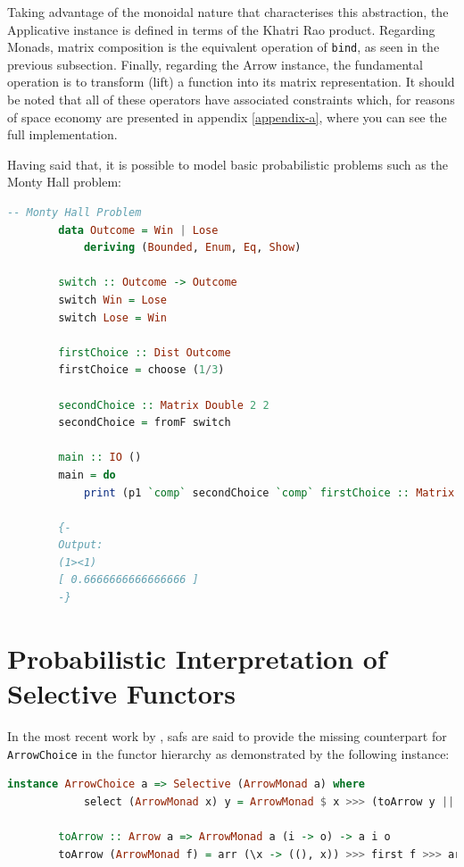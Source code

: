 \documentclass[
  oneside,
  11pt, a4paper,
  footinclude=true,
  headinclude=true,
  cleardoublepage=empty
]{scrbook}
\theoremstyle{definition}
\theoremstyle{definition}
\begin{document}
        Taking advantage of the monoidal nature that characterises this abstraction, the Applicative instance is defined in terms of the Khatri Rao product. Regarding Monads, matrix composition is the equivalent operation of \texttt{bind}, as seen in the previous subsection. Finally, regarding the Arrow instance, the fundamental operation is to transform (lift) a function into its matrix representation. It should be noted that all of these operators have associated constraints which, for reasons of space economy are presented in appendix \ref{appendix-a}, where you can see the full implementation.
        
        Having said that, it is possible to model basic probabilistic problems such as the Monty Hall problem:
        
        \begin{lstlisting}[language=Haskell, caption={LAoP Monty Hall Problem},captionpos=b]
        -- Monty Hall Problem
        data Outcome = Win | Lose
            deriving (Bounded, Enum, Eq, Show)
        
        switch :: Outcome -> Outcome
        switch Win = Lose
        switch Lose = Win
        
        firstChoice :: Dist Outcome
        firstChoice = choose (1/3)
        
        secondChoice :: Matrix Double 2 2
        secondChoice = fromF switch 
    
        main :: IO ()
        main = do 
            print (p1 `comp` secondChoice `comp` firstChoice :: Matrix Double 1 1)
            
        {- 
        Output:
        (1><1)
        [ 0.6666666666666666 ]
        -}
        \end{lstlisting}{}
        
    \section{Probabilistic Interpretation of Selective Functors}
        
        In the most recent work by \cite{andrey2019selective}, \glspl{saf} are said to provide the missing counterpart for \texttt{ArrowChoice} in the functor hierarchy as demonstrated by the following instance:
        
        \begin{lstlisting}[language=Haskell, label={lst:safm}, caption={Selective ArrowMonad instance},captionpos=b]
        instance ArrowChoice a => Selective (ArrowMonad a) where
            select (ArrowMonad x) y = ArrowMonad $ x >>> (toArrow y ||| returnA)
            
        toArrow :: Arrow a => ArrowMonad a (i -> o) -> a i o
        toArrow (ArrowMonad f) = arr (\x -> ((), x)) >>> first f >>> arr (uncurry ($))
        \end{lstlisting}{}
	    
\end{document}
